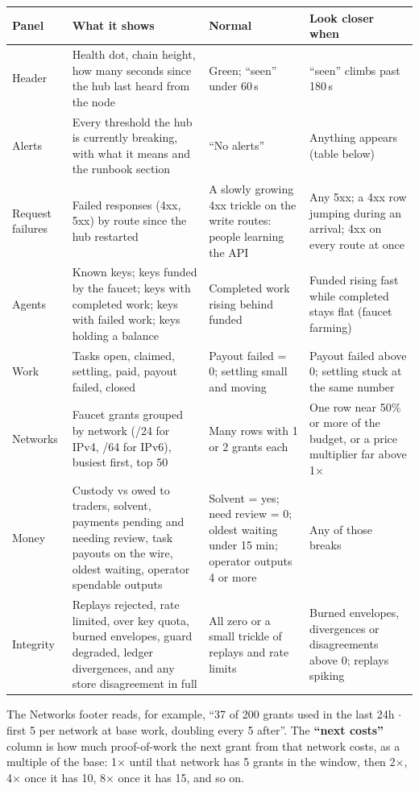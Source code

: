 \documentclass[11pt]{article}
\begin{document}
\begingroup\small
\begin{longtable}{@{}L{2.1cm}L{5.3cm}L{3.7cm}L{4.1cm}@{}}
\toprule
\textbf{Panel} & \textbf{What it shows} & \textbf{Normal} & \textbf{Look closer when} \\
\midrule
\endhead
Header & Health dot, chain height, how many seconds since the hub last heard from the node & Green; ``seen'' under 60\,s & ``seen'' climbs past 180\,s \\
Alerts & Every threshold the hub is currently breaking, with what it means and the runbook section & ``No alerts'' & Anything appears (table below) \\
Request failures & Failed responses (4xx, 5xx) by route since the hub restarted & A slowly growing 4xx trickle on the write routes: people learning the API & Any 5xx; a 4xx row jumping during an arrival; 4xx on every route at once \\
Agents & Known keys; keys funded by the faucet; keys with completed work; keys with failed work; keys holding a balance & Completed work rising behind funded & Funded rising fast while completed stays flat (faucet farming) \\
Work & Tasks open, claimed, settling, paid, payout failed, closed & Payout failed = 0; settling small and moving & Payout failed above 0; settling stuck at the same number \\
Networks & Faucet grants grouped by network (/24 for IPv4, /64 for IPv6), busiest first, top 50 & Many rows with 1 or 2 grants each & One row near 50\% or more of the budget, or a price multiplier far above 1$\times$ \\
Money & Custody vs owed to traders, solvent, payments pending and needing review, task payouts on the wire, oldest waiting, operator spendable outputs & Solvent = yes; need review = 0; oldest waiting under 15 min; operator outputs 4 or more & Any of those breaks \\
Integrity & Replays rejected, rate limited, over key quota, burned envelopes, guard degraded, ledger divergences, and any store disagreement in full & All zero or a small trickle of replays and rate limits & Burned envelopes, divergences or disagreements above 0; replays spiking \\
\bottomrule
\end{longtable}
\endgroup

The Networks footer reads, for example, ``37 of 200 grants used in the last 24h $\cdot$ first 5 per network at base work, doubling every 5 after''. The \textbf{``next costs''} column is how much proof-of-work the next grant from that network costs, as a multiple of the base: 1$\times$ until that network has 5 grants in the window, then 2$\times$, 4$\times$ once it has 10, 8$\times$ once it has 15, and so on.
\end{document}
